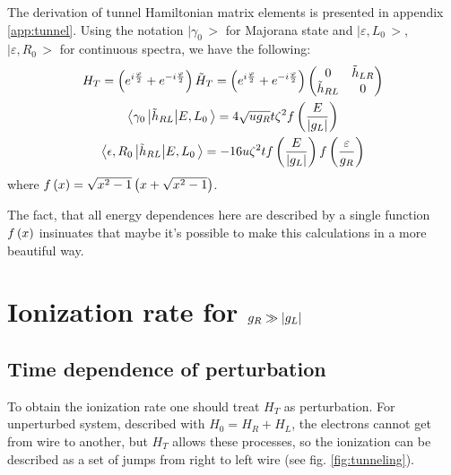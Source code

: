 The derivation of tunnel Hamiltonian matrix elements is presented in appendix \ref{app:tunnel}. Using the notation  $ \big|\gamma_{0}\,\big> $ for Majorana state and $ \big|\varepsilon,L_{0}\,\big> $, $ \big|\varepsilon,R_{0}\,\big> $ for continuous spectra, we have the following:
\begin{gather}
H_T=
\left(e^{i\frac{\varphi}{2}}+e^{-i\frac{\varphi}{2}}\right)
\tilde{H}_{T}
=
\left(e^{i\frac{\varphi}{2}}+e^{-i\frac{\varphi}{2}}\right)
\begin{pmatrix}
0 & \tilde{h}_{LR} \\
\tilde{h}_{RL} & 0
\end{pmatrix}
\\
\label{tunnel_matrix_elements_maj-cont}
	\big<\gamma_{0}\,\big|\tilde{h}_{RL}\big|E,L_{0}\,\big>
	=
	4\sqrt{ug_{R}}
	t\zeta^{2}
	f\left(\frac{E}{\left|g_L\right|}\right)
	\\
	\label{tunnel_matrix_elements_cont-cont}
	\big<\epsilon,R_{0}\,\big|\tilde{h}_{RL}\big|E,L_{0}\,\big>
	=
	-16u\zeta^{2}t
	f\left(\frac{E}{\left|g_L\right|}\right)
	f\left(\frac{\varepsilon}{g_R}\right)
\end{gather}
where $ f\left(x\right)=\sqrt{x^2-1}\left(x+\sqrt{x^2-1}\right) $. 

 The fact, that all energy dependences here are described by a single function $ f\left(x\right) $ insinuates that maybe it's possible to make this calculations in a more beautiful way.

\section{Ionization rate for $ g_R\gg\left|g_L\right| $}


\subsection{Time dependence of perturbation}

To obtain the ionization rate one should treat $ H_T $ as perturbation. For unperturbed system, described with $ H_0=H_R+H_L $, the electrons cannot get from wire to another, but $ H_T $ allows these processes, so the ionization can be described as a set of jumps from right to left wire (see fig. \ref{fig:tunneling}).

